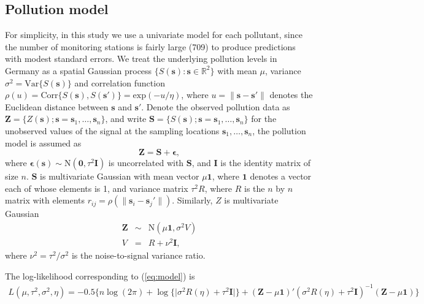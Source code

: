 \documentclass[12,]{article}
\begin{document}
\hypertarget{pollution-model}{%
\subsection{Pollution model}\label{pollution-model}}

For simplicity, in this study we use a univariate model for each
pollutant, since the number of monitoring stations is fairly large (709)
to produce predictions with modest standard errors. We treat the
underlying pollution levels in Germany as a spatial Gaussian process
\(\{S(\symbf{s}):\symbf{s}\in \mathbb{R}^{2}\}\) with mean \(\mu\),
variance \(\sigma^2=\mbox{Var}\{S(\symbf{s})\}\) and correlation
function
\(\rho(u)= \mbox{Corr}\{S(\symbf{s}), S(\symbf{s}\prime)\}= \mbox{exp}(-u/\eta)\),
where \(u=\lVert \symbf{s}-\symbf{s}\prime\rVert\) denotes the Euclidean
distance between \(\symbf{s}\) and \(\symbf{s}\prime\). Denote the
observed pollution data as
\(\symbf{Z}=\{Z(\symbf{s}); \symbf{s}= \symbf{s}_1,\dots,\symbf{s}_n\}\),
and write
\(\symbf{S}=\{S(\symbf{s}); \symbf{s}= \symbf{s}_1,\dots,\symbf{s}_n\}\)
for the unobserved values of the signal at the sampling locations
\(\symbf{s}_1,\dots,\symbf{s}_n\), the pollution model is assumed as
\begin{equation}
\symbf{Z} = \symbf{S} + \symbf{\epsilon},
\label{eq:model}
\end{equation} where
\(\symbf{\epsilon} (\symbf{s}) \sim \mbox{N} (\symbf{0}, \tau^2\symbf{I})\)
is uncorrelated with \(\symbf{S}\), and \(\symbf{I}\) is the identity
matrix of size \(n\). \(\symbf{S}\) is multivariate Gaussian with mean
vector \(\mu \symbf{1}\), where \(\symbf{1}\) denotes a vector each of
whose elements is 1, and variance matrix \(\tau^2 R\), where \(R\) is
the \(n\) by \(n\) matrix with elements
\(r_{ij}=\rho(\lVert \symbf{s}_i-\symbf{s}_j\prime\rVert)\). Similarly,
\(Z\) is multivariate Gaussian \begin{eqnarray}\label{eq:var}
\symbf{Z} &\sim& \mbox{N} (\mu\symbf{1}, \sigma^2 V)\\\nonumber
V &=&  R+\nu^2\symbf{I},
\end{eqnarray} where \(\nu^2=\tau^2/\sigma^2\) is the noise-to-signal
variance ratio.

The log-likelihood corresponding to (\ref{eq:model}) is
\begin{eqnarray}\label{eq:likelihood}
L(\mu, \tau^2,\sigma^2,\eta) = -0.5\{n\log(2\pi)+\log\{\mid \sigma^2 R(\eta)+\tau^2\symbf{I} \mid\}+(\symbf{Z}- \mu\symbf{1})\prime ( \sigma^2 R(\eta)+\tau^2\symbf{I})^{-1} (\symbf{Z} - \mu\symbf{1})\}
\end{eqnarray}
\end{document}

